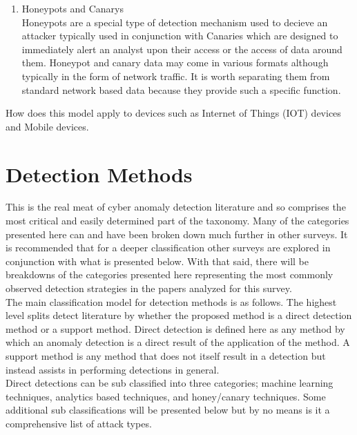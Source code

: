 \documentclass[10pt]{IEEEtran}
\begin{document}
\begin{enumerate}
\begin{enumerate}
            \item Honeypots and Canarys\cite{jasek2013apt}
            \\Honeypots are a special type of detection mechanism used to decieve an attacker typically used in conjunction with Canaries which are designed to immediately alert an analyst upon their access or the access of data around them. Honeypot and canary data may come in various formats although typically in the form of network traffic. It is worth separating them from standard network based data because they provide such a specific function. 
        \end{enumerate}
    How does this model apply to devices such as Internet of Things (IOT) devices and Mobile devices.
\end{enumerate}

\section{Detection Methods}
This is the real meat of cyber anomaly detection literature and so comprises the most critical and easily determined part of the taxonomy. Many of the categories presented here can and have been broken down much further in other surveys. It is recommended that for a deeper classification other surveys are explored in conjunction with what is presented below. With that said, there will be breakdowns of the categories presented here representing the most commonly observed detection strategies in the papers analyzed for this survey.\\
The main classification model for detection methods is as follows. The highest level splits detect literature by whether the proposed method is a direct detection method or a support method. Direct detection is defined here as any method by which an anomaly detection is a direct result of the application of the method. A support method is any method that does not itself result in a detection but instead assists in performing detections in general.\\ 
Direct detections can be sub classified into three categories; machine learning techniques, analytics based techniques, and honey/canary techniques. Some additional sub classifications will be presented below but by no means is it a comprehensive list of attack types. \\
\end{document}
